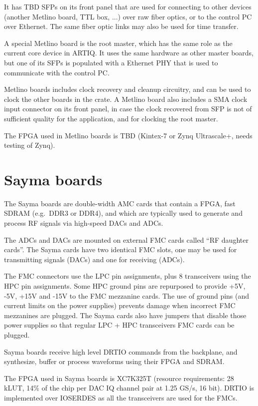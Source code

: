 \documentclass[11pt]{paper}
\begin{document}
It has TBD SFPs on its front panel that are used for connecting to other devices (another Metlino board, TTL box, ...) over raw fiber optics, or to the control PC over Ethernet. The same fiber optic links may also be used for time transfer.

A special Metlino board is the root master, which has the same role as the current core device in ARTIQ. It uses the same hardware as other master boards, but one of its SFPs is populated with a Ethernet PHY that is used to communicate with the control PC.

Metlino boards includes clock recovery and cleanup circuitry, and can be used to clock the other boards in the crate. A Metlino board also includes a SMA clock input connector on its front panel, in case the clock recovered from SFP is not of sufficient quality for the application, and for clocking the root master.

The FPGA used in Metlino boards is TBD (Kintex-7 or Zynq Ultrascale+, needs testing of Zynq).

\section{Sayma boards}
The Sayma boards are double-width AMC cards that contain a FPGA, fast SDRAM (e.g.\ DDR3 or DDR4), and which are typically used to generate and process RF signals via high-speed DACs and ADCs.

The ADCs and DACs are mounted on external FMC cards called ``RF daughter cards''. The Sayma cards have two identical FMC slots, one may be used for transmitting signals (DACs) and one for receiving (ADCs).

The FMC connectors use the LPC pin assignments, plus 8 transceivers using the HPC pin assignments. Some HPC ground pins are repurposed to provide +5V, -5V, +15V and -15V to the FMC mezzanine cards. The use of ground pins (and current limits on the power supplies) prevents damage when incorrect FMC mezzanines are plugged. The Sayma cards also have jumpers that disable those power supplies so that regular LPC + HPC transceivers FMC cards can be plugged.

Sayma boards receive high level DRTIO commands from the backplane, and synthesize, buffer or process waveforms using their FPGA and SDRAM.

The FPGA used in Sayma boards is XC7K325T (resource requirements: 28 kLUT, 14\% of the chip per DAC IQ channel pair at 1.25 GS/s, 16 bit). DRTIO is implemented over IOSERDES as all the transceivers are used for the FMCs.
\end{document}
